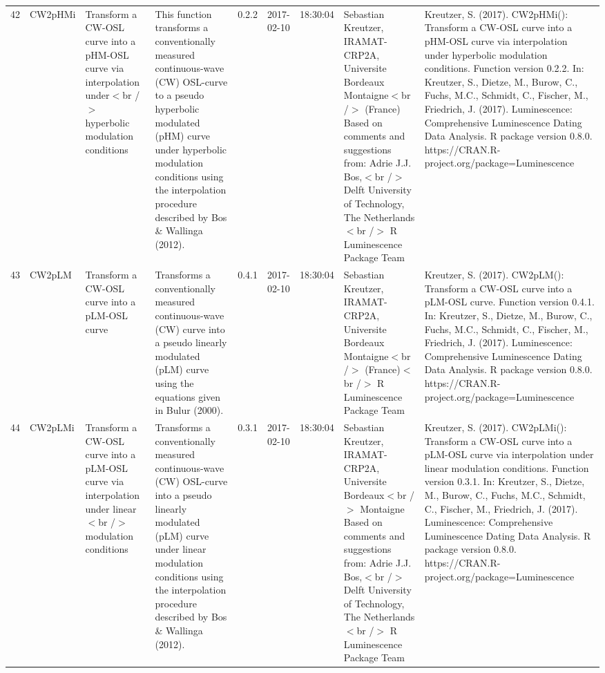 \begin{table}[ht]
\begin{tabular}{rllllllll}
 \\ 
  42 & CW2pHMi & Transform a CW-OSL curve into a pHM-OSL curve via interpolation under$<$br /$>$ hyperbolic modulation conditions & This function transforms a conventionally measured continuous-wave (CW) OSL-curve to a pseudo hyperbolic modulated (pHM) curve under hyperbolic modulation conditions using the interpolation procedure described by Bos \& Wallinga (2012). & 0.2.2 & 2017-02-10 & 18:30:04
 & Sebastian Kreutzer, IRAMAT-CRP2A, Universite Bordeaux Montaigne$<$br /$>$ (France)   Based on comments and suggestions from:  Adrie J.J. Bos,$<$br /$>$ Delft University of Technology, The Netherlands $<$br /$>$  R Luminescence Package Team & Kreutzer, S. (2017). CW2pHMi(): Transform a CW-OSL curve into a pHM-OSL curve via interpolation under hyperbolic modulation conditions. Function version 0.2.2. In: Kreutzer, S., Dietze, M., Burow, C., Fuchs, M.C., Schmidt, C., Fischer, M., Friedrich, J. (2017). Luminescence: Comprehensive Luminescence Dating Data Analysis. R package version 0.8.0. https://CRAN.R-project.org/package=Luminescence
 \\ 
  43 & CW2pLM & Transform a CW-OSL curve into a pLM-OSL curve & Transforms a conventionally measured continuous-wave (CW) curve into a pseudo linearly modulated (pLM) curve using the equations given in Bulur (2000). & 0.4.1 & 2017-02-10 & 18:30:04
 & Sebastian Kreutzer, IRAMAT-CRP2A, Universite Bordeaux Montaigne$<$br /$>$ (France)$<$br /$>$  R Luminescence Package Team & Kreutzer, S. (2017). CW2pLM(): Transform a CW-OSL curve into a pLM-OSL curve. Function version 0.4.1. In: Kreutzer, S., Dietze, M., Burow, C., Fuchs, M.C., Schmidt, C., Fischer, M., Friedrich, J. (2017). Luminescence: Comprehensive Luminescence Dating Data Analysis. R package version 0.8.0. https://CRAN.R-project.org/package=Luminescence
 \\ 
  44 & CW2pLMi & Transform a CW-OSL curve into a pLM-OSL curve via interpolation under linear$<$br /$>$ modulation conditions & Transforms a conventionally measured continuous-wave (CW) OSL-curve into a pseudo linearly modulated (pLM) curve under linear modulation conditions using the interpolation procedure described by Bos \& Wallinga (2012). & 0.3.1 & 2017-02-10 & 18:30:04
 & Sebastian Kreutzer, IRAMAT-CRP2A, Universite Bordeaux$<$br /$>$ Montaigne  Based on comments and suggestions from:  Adrie J.J. Bos,$<$br /$>$ Delft University of Technology, The Netherlands $<$br /$>$  R Luminescence Package Team & Kreutzer, S. (2017). CW2pLMi(): Transform a CW-OSL curve into a pLM-OSL curve via interpolation under linear modulation conditions. Function version 0.3.1. In: Kreutzer, S., Dietze, M., Burow, C., Fuchs, M.C., Schmidt, C., Fischer, M., Friedrich, J. (2017). Luminescence: Comprehensive Luminescence Dating Data Analysis. R package version 0.8.0. https://CRAN.R-project.org/package=Luminescence

\end{tabular}
\end{table}
